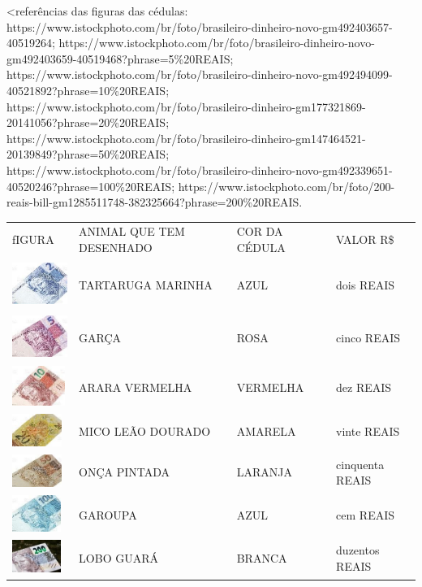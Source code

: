 \textless{}referências das figuras das cédulas:
https://www.istockphoto.com/br/foto/brasileiro-dinheiro-novo-gm492403657-40519264;
https://www.istockphoto.com/br/foto/brasileiro-dinheiro-novo-gm492403659-40519468?phrase=5\%20REAIS;
https://www.istockphoto.com/br/foto/brasileiro-dinheiro-novo-gm492494099-40521892?phrase=10\%20REAIS;
https://www.istockphoto.com/br/foto/brasileiro-dinheiro-gm177321869-20141056?phrase=20\%20REAIS;
https://www.istockphoto.com/br/foto/brasileiro-dinheiro-gm147464521-20139849?phrase=50\%20REAIS;
https://www.istockphoto.com/br/foto/brasileiro-dinheiro-novo-gm492339651-40520246?phrase=100\%20REAIS;
https://www.istockphoto.com/br/foto/200-reais-bill-gm1285511748-382325664?phrase=200\%20REAIS.

\begin{longtable}[]{@{}llll@{}}
\toprule
fIGURA & ANIMAL QUE TEM DESENHADO & COR DA CÉDULA & VALOR
R\$\tabularnewline
\includegraphics[width=0.79592in,height=0.59694in]{media/image47.jpg} &
TARTARUGA MARINHA & AZUL & dois REAIS\tabularnewline
\includegraphics[width=0.73274in,height=0.54956in]{media/image48.jpg} &
GARÇA & ROSA & cinco REAIS\tabularnewline
\includegraphics[width=0.68163in,height=0.51122in]{media/image49.jpg} &
ARARA VERMELHA & VERMELHA & dez REAIS\tabularnewline
\includegraphics[width=0.63139in,height=0.41990in]{media/image50.jpg} &
MICO LEÃO DOURADO & AMARELA & vinte REAIS\tabularnewline
\includegraphics[width=0.63326in,height=0.42114in]{media/image51.jpg} &
ONÇA PINTADA & LARANJA & cinquenta REAIS\tabularnewline
\includegraphics[width=0.62794in,height=0.47095in]{media/image52.jpg} &
GAROUPA & AZUL & cem REAIS\tabularnewline
\includegraphics[width=0.63126in,height=0.42104in]{media/image53.jpg} &
LOBO GUARÁ & BRANCA & duzentos REAIS\tabularnewline
\bottomrule
\end{longtable}

